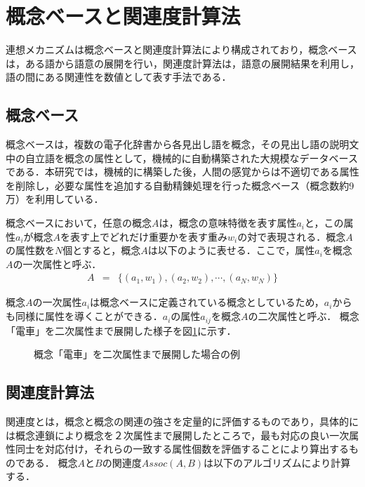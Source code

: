 \section{概念ベースと関連度計算法}
連想メカニズムは概念ベースと関連度計算法により構成されており，概念ベース\cite{hirose:02,kojima:02}は，ある語から語意の展開を行い，関連度計算法\cite{watabe:01}は，語意の展開結果を利用し，語の間にある関連性を数値として表す手法である．

\subsection{概念ベース}\label{consept_base}
概念ベースは，複数の電子化辞書から各見出し語を概念，その見出し語の説明文中の自立語を概念の属性として，機械的に自動構築された大規模なデータベースである．本研究では，機械的に構築した後，人間の感覚からは不適切である属性を削除し，必要な属性を追加する自動精錬処理を行った概念ベース（概念数約9万）\cite{hirose:02}を利用している．

概念ベースにおいて，任意の概念$A$は，概念の意味特徴を表す属性$a_i$と，この属性$a_i$が概念$A$を表す上でどれだけ重要かを表す重み$w_i$の対で表現される．概念$A$の属性数を$N$個とすると，概念$A$は以下のように表せる．ここで，属性$a_i$を概念$A$の一次属性と呼ぶ．
\begin{eqnarray}
A &=& \{ (a_1, w_1), (a_2, w_2), \cdots, (a_N, w_N) \}
\end{eqnarray}

概念$A$の一次属性$a_i$は概念ベースに定義されている概念としているため，$a_i$からも同様に属性を導くことができる．$a_i$の属性$a_{ij}$を概念$A$の二次属性と呼ぶ．
概念「電車」を二次属性まで展開した様子を図\ref{concept_base}に示す．

\begin{figure}[t]
\caption{概念「電車」を二次属性まで展開した場合の例}
\label{concept_base}
\end{figure}

\subsection{関連度計算法}
関連度とは，概念と概念の関連の強さを定量的に評価するものであり，具体的には概念連鎖により概念を２次属性まで展開したところで，最も対応の良い一次属性同士を対応付け，それらの一致する属性個数を評価することにより算出するものである．
概念$A$と$B$の関連度$Assoc(A,B)$は以下のアルゴリズムにより計算する\cite{watabe:01}．

